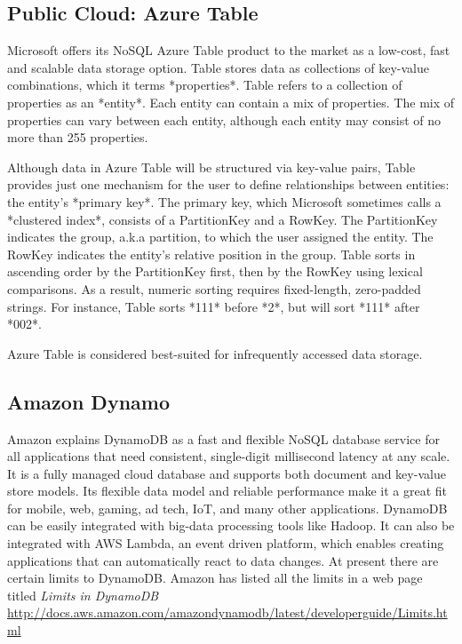 \subsection{ Public Cloud: Azure Table}

     Microsoft offers its NoSQL Azure Table product to the market as a
     low-cost, fast and scalable data storage
     option. \cite{www-what-to-use} Table stores data as collections
     of key-value combinations, which it terms *properties*.  Table
     refers to a collection of properties as an *entity*.  Each entity
     can contain a mix of properties.  The mix of properties can vary
     between each entity, although each entity may consist of no more
     than 255 properties. \cite{www-blobqueuetable}

     Although data in Azure Table will be structured via key-value
     pairs, Table provides just one mechanism for the user to define
     relationships between entities: the entity's *primary key*.  The
     primary key, which Microsoft sometimes calls a *clustered index*,
     consists of a PartitionKey and a RowKey.  The PartitionKey
     indicates the group, a.k.a partition, to which the user assigned
     the entity.  The RowKey indicates the entity's relative position
     in the group.  Table sorts in ascending order by the PartitionKey
     first, then by the RowKey using lexical comparisons.  As a
     result, numeric sorting requires fixed-length, zero-padded
     strings.  For instance, Table sorts *111* before *2*, but will
     sort *111* after *002*. \cite{www-scalable-partitioning}

     Azure Table is considered best-suited for infrequently accessed
     data storage.

\subsection{ Amazon Dynamo}

     Amazon explains DynamoDB as \cite{www.dyndb} a fast and flexible 
     NoSQL database service for all applications that need consistent, 
     single-digit millisecond latency at any scale. It is a fully managed 
     cloud database and supports both document and key-value store models. 
     Its flexible data model and reliable performance make it a great fit 
     for mobile, web, gaming, ad tech, IoT, and many other applications. 
     DynamoDB can be easily integrated with big-data processing tools like 
     Hadoop. It can also be integrated with AWS Lambda, an event driven platform, 
     which enables creating applications that can automatically react to data 
     changes. At present there are certain limits to DynamoDB. Amazon has listed 
     all the limits in a web page titled {\em Limits in DynamoDB }
     \url{http://docs.aws.amazon.com/amazondynamodb/latest/developerguide/Limits.html}


